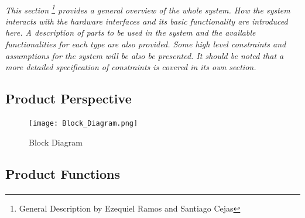 \documentclass[12pt]{article}
\begin{document}
	\paragraph{}\textit{This section \footnote{General Description by Ezequiel Ramos and 
	Santiago Cejas} provides a general overview of the whole system. How the system interacts with 
	the hardware interfaces and its basic functionality are introduced here. A description of
	parts to be used in the system and the available functionalities for each type are also 
	provided. Some high level constraints and assumptions for the system will be also be presented.
	It should be noted that a more detailed specification of constraints is covered in its 
	own section.}
	
	\subsection{Product Perspective}
		\paragraph{} 

		\paragraph{} 
		
		\begin{figure}[H]
  			\centerline{\texttt{[image: Block\_Diagram.png]}}
  			\caption{Block Diagram}
  			\label{fig:block}
		\end{figure}
		
		\paragraph{} 
		\paragraph{} 	
		\paragraph{} 

	\subsection{Product Functions}
		\paragraph{} 
		
\end{document}
